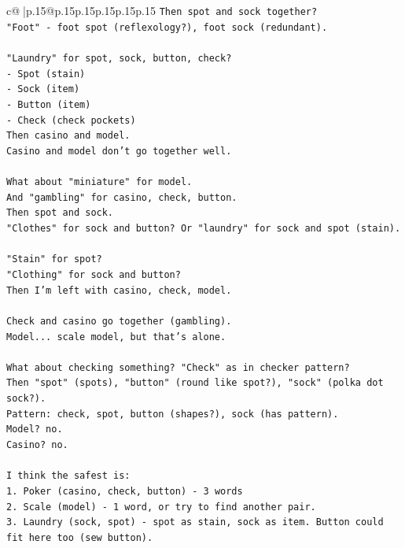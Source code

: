 \documentclass{article}
\begin{document}
{\begin{supertabular}{c@{$\;$}|p{.15\linewidth}@{}p{.15\linewidth}p{.15\linewidth}p{.15\linewidth}p{.15\linewidth}p{.15\linewidth}}
{{{\texttt{Then spot and sock together?} \\
\texttt{"Foot" {-} foot spot (reflexology?), foot sock (redundant).} \\
\\ 
\texttt{"Laundry" for spot, sock, button, check?} \\
\texttt{{-} Spot (stain)} \\
\texttt{{-} Sock (item)} \\
\texttt{{-} Button (item)} \\
\texttt{{-} Check (check pockets)} \\
\texttt{Then casino and model.} \\
\texttt{Casino and model don't go together well.} \\
\\ 
\texttt{What about "miniature" for model.} \\
\texttt{And "gambling" for casino, check, button.} \\
\texttt{Then spot and sock.} \\
\texttt{"Clothes" for sock and button? Or "laundry" for sock and spot (stain).} \\
\\ 
\texttt{"Stain" for spot?} \\
\texttt{"Clothing" for sock and button?} \\
\texttt{Then I'm left with casino, check, model.} \\
\\ 
\texttt{Check and casino go together (gambling).} \\
\texttt{Model... scale model, but that's alone.} \\
\\ 
\texttt{What about checking something? "Check" as in checker pattern?} \\
\texttt{Then "spot" (spots), "button" (round like spot?), "sock" (polka dot sock?).} \\
\texttt{Pattern: check, spot, button (shapes?), sock (has pattern).} \\
\texttt{Model? no.} \\
\texttt{Casino? no.} \\
\\ 
\texttt{I think the safest is:} \\
\texttt{1. Poker (casino, check, button) {-} 3 words} \\
\texttt{2. Scale (model) {-} 1 word, or try to find another pair.} \\
\texttt{3. Laundry (sock, spot) {-} spot as stain, sock as item. Button could fit here too (sew button).} \\
}}}
\end{supertabular}}
\end{document}
